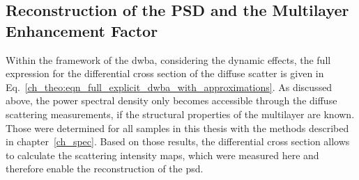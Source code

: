 \subsection{Reconstruction of the PSD and the Multilayer Enhancement Factor}
\label{ch_diff:sec_determination_of_the_psd}
Within the framework of the \gls{dwba}, considering the dynamic effects, the full expression for the differential cross section of the diffuse scatter is given in Eq.~\eqref{ch_theo:eqn_full_explicit_dwba_with_approximations}. As discussed above, the power spectral density only becomes accessible through the diffuse scattering measurements, if the structural properties of the multilayer are known. Those were determined for all samples in this thesis with the methods described in chapter~\ref{ch_spec}. Based on those results, the differential cross section allows to calculate the scattering intensity maps, which were measured here and therefore enable the reconstruction of the \gls{psd}.

